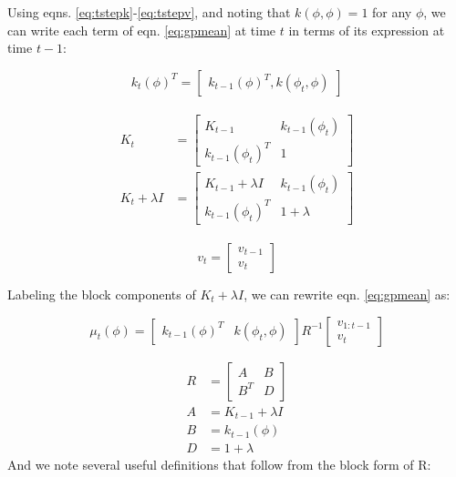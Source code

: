 \documentclass[12pt, conference]{IEEEtran}
\begin{document}
Using eqns. \ref{eq:tstepk}-\ref{eq:tstepv}, and noting that $k(\phi,\phi)=1$ for any $\phi$, we can write each term of eqn. \ref{eq:gpmean} at time $t$ in terms of its expression at time $t-1$:

\begin{equation}
    k_t(\phi)^T=
    \begin{bmatrix}
        k_{t-1}(\phi)^T, k(\phi_t,\phi)
    \end{bmatrix}
\end{equation}

\begin{align}
\begin{split}
    K_t &=
    \begin{bmatrix}
        K_{t-1} & k_{t-1}(\phi_t) \\
        k_{t-1}(\phi_t)^T & 1
    \end{bmatrix}
    \\
    K_t+\lambda I &=
    \begin{bmatrix}
        K_{t-1}+\lambda I & k_{t-1}(\phi_t) \\
        k_{t-1}(\phi_t)^T & 1 + \lambda
    \end{bmatrix}
\end{split}
\end{align}

\begin{equation}
    v_t = 
    \begin{bmatrix}
        v_{t-1} \\
        v_t
    \end{bmatrix}
\end{equation}
\smallskip

Labeling the block components of $K_t+\lambda I$, we can rewrite eqn. \ref{eq:gpmean} as:

\begin{equation}
    \mu_t(\phi) =
    \begin{bmatrix}
        k_{t-1}(\phi)^T & k(\phi_t,\phi)
    \end{bmatrix}
    R^{-1}
    \begin{bmatrix}
        v_{1:t-1} \\
        v_t
    \end{bmatrix}
    \label{eq:gpmeanblock}
\end{equation}

\begin{align}
    R&=
    \begin{bmatrix}
        A & B \\
        B^T & D
    \end{bmatrix}
    \nonumber \\
    A &= K_{t-1}+\lambda I \nonumber \\
    B &= k_{t-1}(\phi) \nonumber \\
    D &= 1+\lambda \nonumber
\end{align}
\smallskip
And we note several useful definitions that follow from the block form of R:
\end{document}
